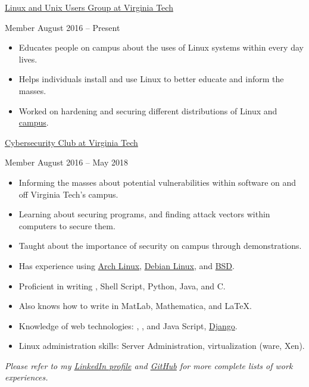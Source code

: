 \documentclass[10pt,a4paper]{article}
\begin{document}



\headedsection
  {\href{https://vtluug.org/}{Linux and Unix Users Group at Virginia Tech}}
   {

  \headedsubsection
    {Member}
    {August 2016 -- Present}
    {\begin{itemize}
        \item Educates people on campus about the uses of Linux systems within every day lives.
        \item Helps individuals install and use Linux to better educate and inform the masses.
        \item Worked on hardening and securing different distributions of Linux and \href{https://www.hokieprivacy.org/}{campus}.
    \end{itemize}}
}


\headedsection
  {\href{http://vtcsec.org/}{Cybersecurity Club at Virginia Tech}}
  {\small\textsc{}} {

  \headedsubsection
    {Member}
    {August 2016 -- May 2018}
    {\begin{itemize}
        \item Informing the masses about potential vulnerabilities within software on and off Virginia Tech's campus.
        \item Learning about securing programs, and finding attack vectors within computers to secure them.
        \item Taught about the importance of security on campus through demonstrations.
    \end{itemize}}
}


\smallskip
\spacedhrule{-0.2em}{-0.4em}


  {
  \begin{itemize}
    \item Has experience using \href{https://www.archlinux.org/}{Arch Linux}, 
    \href{https://www.debian.org/}{Debian Linux}, and \href{http://www.bsd.org/}{BSD}. 
    \item Proficient in writing \CPP, Shell Script, Python, Java, and C.
    \item Also knows how to write in MatLab, Mathematica, and LaTeX\nsp.
    \item Knowledge of web technologies: , , and Java Script, \href{https://www.djangoproject.com/}{Django}.
    \item Linux administration skills: Server Administration, virtualization (ware, Xen).
  \end{itemize}}
\spacedhrule{1 em}{1 em}

\begin{center}
  \emph{\small Please refer to my \href{https://www.linkedin.com/in/aaron-v-brown-ba3684101/}{LinkedIn profile} and \href{https://github.com/DaBrownDev}{GitHub} for more complete lists of work experiences.}
\end{center}
\spacedhrule{1 em}{1 em}
\end{document}

